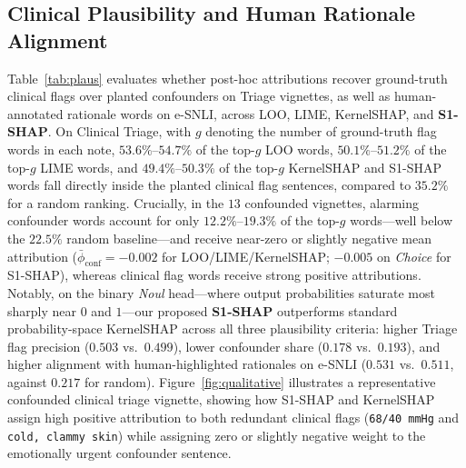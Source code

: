 \documentclass[10pt]{article}
\begin{document}
\subsection{Clinical Plausibility and Human Rationale Alignment}
\label{sec:plausibility}
Table~\ref{tab:plaus} evaluates whether post-hoc attributions recover ground-truth clinical flags over planted confounders on Triage vignettes, as well as human-annotated rationale words on e-SNLI, across LOO, LIME, KernelSHAP, and \textbf{S1-SHAP}.
On Clinical Triage, with $g$ denoting the number of ground-truth flag words in each note, $53.6\%$--$54.7\%$ of the top-$g$ LOO words, $50.1\%$--$51.2\%$ of the top-$g$ LIME words, and $49.4\%$--$50.3\%$ of the top-$g$ KernelSHAP and S1-SHAP words fall directly inside the planted clinical flag sentences, compared to $35.2\%$ for a random ranking.
Crucially, in the $13$ confounded vignettes, alarming confounder words account for only $12.2\%$--$19.3\%$ of the top-$g$ words---well below the $22.5\%$ random baseline---and receive near-zero or slightly negative mean attribution ($\bar{\phi}_{\text{conf}} = -0.002$ for LOO/LIME/KernelSHAP; $-0.005$ on \emph{Choice} for S1-SHAP), whereas clinical flag words receive strong positive attributions.
Notably, on the binary \emph{Noul} head---where output probabilities saturate most sharply near $0$ and $1$---our proposed \textbf{S1-SHAP} outperforms standard probability-space KernelSHAP across all three plausibility criteria: higher Triage flag precision ($0.503$ vs.\ $0.499$), lower confounder share ($0.178$ vs.\ $0.193$), and higher alignment with human-highlighted rationales on e-SNLI ($0.531$ vs.\ $0.511$, against $0.217$ for random).
Figure~\ref{fig:qualitative} illustrates a representative confounded clinical triage vignette, showing how S1-SHAP and KernelSHAP assign high positive attribution to both redundant clinical flags (\texttt{68/40 mmHg} and \texttt{cold, clammy skin}) while assigning zero or slightly negative weight to the emotionally urgent confounder sentence.
\end{document}
